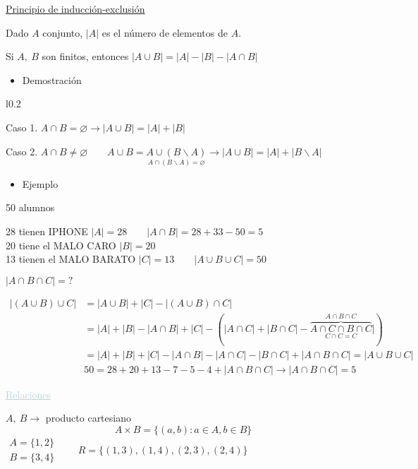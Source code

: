 \documentclass[12pt]{article}
\begin{document}
{\color{lightblue}\underline{Principio de inducción-exclusión}}

Dado $A$ conjunto, $|A|$ es el número de elementos de $A$.

Si $A,~B$ son finitos, entonces $|A\cup B|=|A|-|B|-|A\cap B|$

\begin{itemize}[label=\color{red}\textbullet, leftmargin=*]
	\item \color{lightblue}Demostración
\end{itemize}
\begin{wrapfigure}[2]{l}{0.2\textwidth}
	\begin{venndiagram2sets}[shade=lightblue!50, tikzoptions={scale=0.7}]
		\fillACapB
	\end{venndiagram2sets}
\end{wrapfigure}

Caso 1. $A\cap B=\varnothing\longrightarrow|A\cup B|=|A|+|B|$

Caso 2. $A\cap B\neq\varnothing\qquad A\cup B=\underset{\displaystyle A\cap (B\backslash A)=\varnothing}{A\cup(B\backslash A)}\longrightarrow|A\cup B|=|A|+|B\backslash A|$\newline

\begin{itemize}[label=\color{red}\textbullet, leftmargin=*]
	\item \color{lightblue} Ejemplo
\end{itemize}
50 alumnos 

28 tienen IPHONE $|A|=28\qquad|A\cap B|=28+33-50=5$ \\
20 tiene el MALO CARO $|B|=20$\\
13 tienen el MALO BARATO $|C|=13\qquad|A\cup B\cup C|=50$

$|A\cap B\cap C|=?$

$\begin{array}{ll}
	|(A\cup B)\cup C|&=|A\cup B|+|C|-|(A\cup B)\cap C|\\
	&=|A|+|B|-|A\cap B|+|C|-(|A\cap C|+|B\cap C|-\underset{C\cap C=C}{\overbrace{A\cap C\cap B\cap C}^{A\cap B\cap C}}|)\\
	&=|A|+|B|+|C|-|A\cap B|-|A\cap C|-|B\cap C|+|A\cap B\cap C|=|A\cup B\cup C|\\
	& 50=28+20+13-7-5-4+|A\cap B\cap C|\longrightarrow|A\cap B\cap C|=5
\end{array}$

\textcolor{lightblue}{\underline{Relaciones}}

$A,~B\longrightarrow$ producto cartesiano \[ A\times B=\{(a,b):a\in A,b\in B\} \] $\begin{array}{l}
	A=\{1,2\}\\
	B=\{3,4\}
\end{array}\qquad R=\{(1,3),(1,4),(2,3),(2,4)\}$
\end{document}
